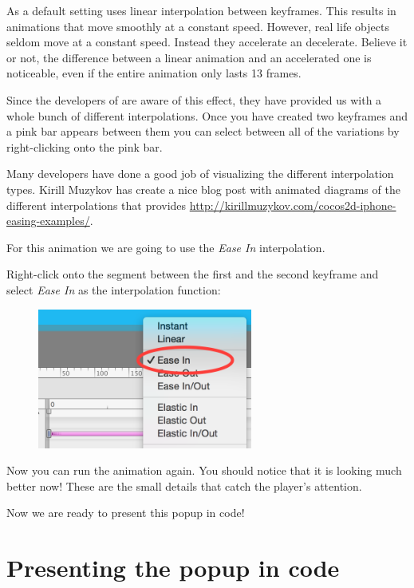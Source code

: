 As a default setting \SB{} uses linear interpolation between
keyframes.\label{timeline_interpolation} This results in animations
that move smoothly at a constant speed. However, real life objects seldom move at a constant speed. Instead they accelerate an decelerate.
Believe it or not, the difference between a linear animation and an accelerated
one is noticeable, even if the entire animation only lasts 13 frames.

Since the developers of \cocos{} are aware of this effect, they have provided us
with a whole bunch of different interpolations. Once you have created two
keyframes and a pink bar appears between them you can select between all of
the variations by right-clicking onto the pink bar.

Many developers have done a good job of visualizing the different interpolation
types. Kirill Muzykov has create a nice blog post with animated diagrams of the
different interpolations that \cocos{} provides
\url{http://kirillmuzykov.com/cocos2d-iphone-easing-examples/}.

For this animation we are going to use the \textit{Ease In} interpolation.

\begin{leftbar}
Right-click onto the segment between the first and the second keyframe and
select \textit{Ease In} as the interpolation function:
\begin{figure}[H]
    \centering
    \includegraphics[width=200pt]{images/Chapter7/timeline_ease_in.png}
\end{figure}
\end{leftbar}

Now you can run the animation again. You should notice that it is looking much
better now! These are the small details that catch the player's attention.

Now we are ready to present this popup in code!


\section{Presenting the popup in code}

